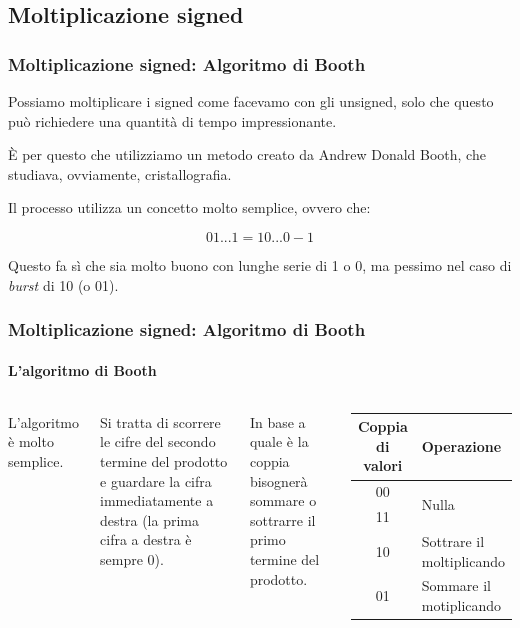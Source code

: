 \documentclass{beamer}
\begin{document}
	\subsection{Moltiplicazione signed}  
  \begin{frame}
    \frametitle{Moltiplicazione signed: Algoritmo di Booth}    	
		Possiamo moltiplicare i signed come facevamo con gli unsigned,
		solo che questo può richiedere una quantità di tempo impressionante.
		
		\vspace{2em}
		
		È per questo che utilizziamo un metodo creato da Andrew Donald Booth, che studiava,
		ovviamente, cristallografia.
		
		\vspace{2em}
		
		Il processo utilizza un concetto molto semplice, ovvero che:
		
		$$01\text{...}1 = 10\text{...}0 - 1$$
		
		Questo fa sì che sia molto buono con lunghe serie di 1 o 0, ma pessimo nel
		caso di \emph{burst} di 10 (o 01).
  \end{frame}
  \begin{frame}
    \frametitle{Moltiplicazione signed: Algoritmo di Booth}
    \framesubtitle{L'algoritmo di Booth}
    \begin{columns}
    	  L'algoritmo è molto semplice.
    	  
    	  Si tratta di scorrere le cifre del secondo termine del
    	  prodotto e guardare la cifra immediatamente a destra
    	  (la prima cifra a destra è sempre 0).
    	  
			\vspace{2em}    	  
    	  
    	  In base a quale è la coppia bisognerà sommare o sottrarre
    	  il primo termine del prodotto.
    		\begin{center}
			\begin{tabular}{|c||p{6em}|}
				\hline				
				Coppia di valori & Operazione \\
				\hline
				00 & \multirow{2}{*}{Nulla} \\
				11 & \\
				\hline				
				10 & Sottrare il moltiplicando 	\\
				\hline				
				01 & Sommare il motiplicando 		\\
				\hline 
			\end{tabular}
			\end{center}
    \end{columns}
  \end{frame}
\end{document}

